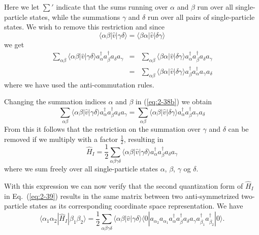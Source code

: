 \documentclass[graybox,sectrefs,envcountresetchap,open=right]{svmonodo}
\begin{document}
Here we let $\sum'$ indicate that the sums running over $\alpha$ and $\beta$ run over all
single-particle states, while the summations  $\gamma$ and $\delta$ 
run over all pairs of single-particle states. We wish to remove this restriction and since
\begin{equation}
	\langle \alpha\beta|\hat{v}|\gamma\delta\rangle = \langle \beta\alpha|\hat{v}|\delta\gamma\rangle \label{eq:2-37}
\end{equation}
we get
\begin{eqnarray}
	\sum_{\alpha\beta} \langle \alpha\beta|\hat{v}|\gamma\delta\rangle a^{\dagger}_\alpha a^{\dagger}_\beta a_\delta a_\gamma &=& 
		\sum_{\alpha\beta} \langle \beta\alpha|\hat{v}|\delta\gamma\rangle 
		a^{\dagger}_\alpha a^{\dagger}_\beta a_\delta a_\gamma \label{eq:2-38a} \\
	&=& \sum_{\alpha\beta}\langle \beta\alpha|\hat{v}|\delta\gamma\rangle
		a^{\dagger}_\beta a^{\dagger}_\alpha a_\gamma a_\delta \label{eq:2-38b}
\end{eqnarray}
where we  have used the anti-commutation rules.




Changing the summation indices 
$\alpha$ and $\beta$ in (\ref{eq:2-38b}) we obtain
\begin{equation}
	\sum_{\alpha\beta} \langle \alpha\beta|\hat{v}|\gamma\delta\rangle a^{\dagger}_\alpha a^{\dagger}_\beta a_\delta a_\gamma =
		 \sum_{\alpha\beta} \langle \alpha\beta|\hat{v}|\delta\gamma\rangle 
		  a^{\dagger}_\alpha a^{\dagger}_\beta  a_\gamma a_\delta \label{eq:2-38c}
\end{equation}
From this it follows that the restriction on the summation over $\gamma$ and $\delta$ can be removed if we multiply with a factor $\frac{1}{2}$, resulting in 
\begin{equation}
	\hat{H}_I = \frac{1}{2} \sum_{\alpha\beta\gamma\delta} \langle \alpha\beta|\hat{v}|\gamma\delta\rangle
		a^{\dagger}_\alpha a^{\dagger}_\beta a_\delta a_\gamma \label{eq:2-39}
\end{equation}
where we sum freely over all single-particle states $\alpha$, 
$\beta$, $\gamma$ og $\delta$.






With this expression we can now verify that the second quantization form of $\hat{H}_I$ in Eq.~(\ref{eq:2-39}) 
results in the same matrix between two anti-symmetrized two-particle states as its corresponding coordinate
space representation. We have  
\begin{equation}
	\langle \alpha_1 \alpha_2|\hat{H}_I|\beta_1 \beta_2\rangle =
		\frac{1}{2} \sum_{\alpha\beta\gamma\delta}
			\langle \alpha\beta|\hat{v}|\gamma\delta\rangle \langle 0|a_{\alpha_2} a_{\alpha_1} 
			 a^{\dagger}_\alpha a^{\dagger}_\beta a_\delta a_\gamma 
			 a_{\beta_1}^{\dagger} a_{\beta_2}^{\dagger}|0\rangle. \label{eq:2-40}
\end{equation}
\end{document}
